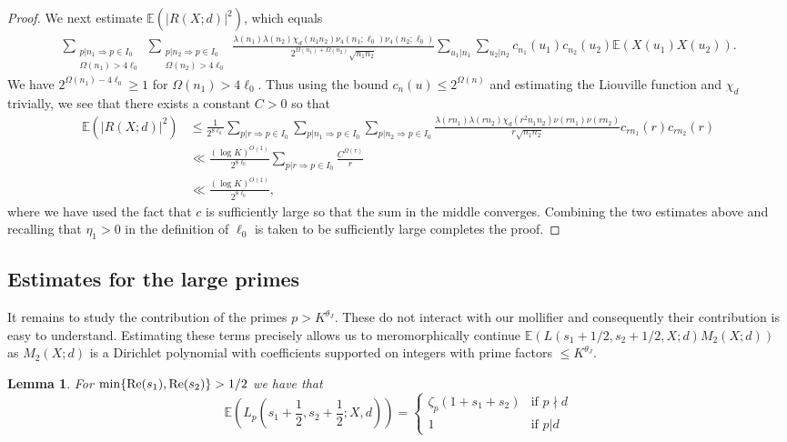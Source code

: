 \documentclass[a4paper,10pt,twoside]{amsart}
\newtheorem{lemma}[theorem]{Lemma}
\theoremstyle{definition}
\numberwithin{equation}{section}
\renewcommand{\Re}{\textnormal{Re}}
\renewcommand\:{\colon}
\begin{document}
\begin{proof}
We next estimate $\mathbb E(|R(X;d)|^2)$, which equals
\begin{align*}
\sum_{\substack{p|n_1\Rightarrow p\in I_0\\
\Omega(n_1)>4\ell_0}}\sum_{\substack{p|n_2\Rightarrow p\in I_0\\
\Omega(n_2)>4\ell_0}}\frac{\lambda(n_1)\lambda(n_2)\chi_d(n_1n_2)\nu_4(n_1;\ell_0)\nu_4(n_2;\ell_0)}{2^{\Omega(n_1)+\Omega(n_2)}\sqrt{n_1n_2}}\sum_{u_1|n_1}\sum_{u_2|n_2}c_{n_1}(u_1)c_{n_2}(u_2)\mathbb E(X(u_1)X(u_2)). 
\end{align*}
We have $2^{\Omega(n_1)-4\ell_0}\geq 1$ for $\Omega(n_1)>4\ell_0$. Thus using the bound $c_n(u)\leq 2^{\Omega(n)}$ and estimating the Liouville function and $\chi_d$ trivially, we see that there exists a constant $C>0$ so that 
\begin{align}\label{error-estimate}
\mathbb E(|R(X;d)|^2)&\leq\frac1{2^{8\ell_0}}\sum_{p|r\Rightarrow p\in I_0}\sum_{p|n_1\Rightarrow p\in I_0}\sum_{p|n_2\Rightarrow p\in I_0}\frac{\lambda(rn_1)\lambda(rn_2)\chi_d(r^2n_1n_2)\nu(rn_1)\nu(rn_2)}{r\sqrt{n_1n_2}}c_{rn_1}(r)c_{rn_2}(r) \nonumber\\
&\ll\frac{(\log K)^{O(1)}}{2^{8\ell_0}}\sum_{p|r\Rightarrow p\in I_0}\frac{C^{\Omega(r)}}r \nonumber\\
&\ll\frac{(\log K)^{O(1)}}{2^{8\ell_0}},
\end{align}
where we have used the fact that $c$ is sufficiently large so that the sum in the middle converges. Combining the two estimates above and recalling that $\eta_1>0$ in the definition of $\ell_0$ is taken to be sufficiently large completes the proof.
\end{proof}

\subsection{Estimates for the large primes}
It remains to study the contribution of the primes $p>K^{\theta_J}$. These do not interact with our mollifier and consequently their contribution is easy to understand. Estimating these terms precisely allows us to meromorphically continue $\mathbb E(L(s_1+1/2,s_2+1/2,X;d)M_2(X;d))$ as $M_2(X;d)$ is a Dirichlet polynomial with coefficients supported on integers with prime factors $\leq K^{\theta_J}$. 

\begin{lemma}
For $\min\{\Re(s_1),\Re(s_2)\}>1/2$ we have that 
\[ 
\mathbb E\left(L_p\left(s_1+\frac12, s_2+\frac12;X,d\right)\right)=\begin{cases}
\zeta_p(1+s_1+s_2) &\text{if }p\nmid d \\
1 & \text{if }p|d
\end{cases} 
\]
\end{lemma}
\end{document}
